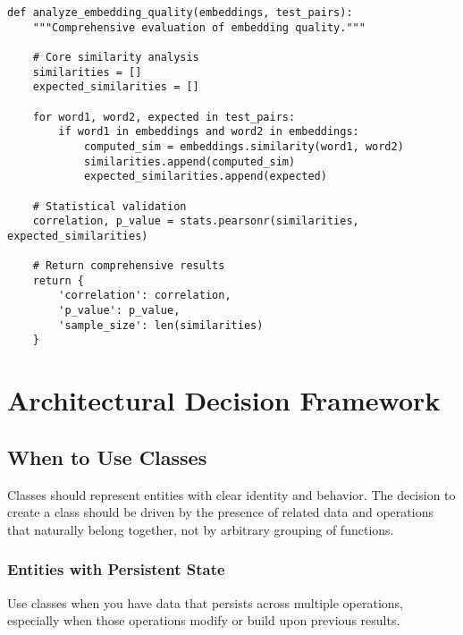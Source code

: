 \documentclass[11pt,a4paper]{article}
\begin{document}
\begin{lstlisting}[caption=Visual organization through whitespace]
def analyze_embedding_quality(embeddings, test_pairs):
    """Comprehensive evaluation of embedding quality."""
    
    # Core similarity analysis
    similarities = []
    expected_similarities = []
    
    for word1, word2, expected in test_pairs:
        if word1 in embeddings and word2 in embeddings:
            computed_sim = embeddings.similarity(word1, word2)
            similarities.append(computed_sim)
            expected_similarities.append(expected)
    
    # Statistical validation
    correlation, p_value = stats.pearsonr(similarities, expected_similarities)
    
    # Return comprehensive results
    return {
        'correlation': correlation,
        'p_value': p_value,
        'sample_size': len(similarities)
    }
\end{lstlisting}

\section{Architectural Decision Framework}

\subsection{When to Use Classes}

Classes should represent entities with clear identity and behavior. The decision to create a class should be driven by the presence of related data and operations that naturally belong together, not by arbitrary grouping of functions.

\subsubsection{Entities with Persistent State}

Use classes when you have data that persists across multiple operations, especially when those operations modify or build upon previous results.
\end{document}
